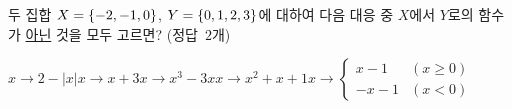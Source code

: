 두 집합 $X=\{-2{,}\mkern3mu\mathopen{}-1{,}\mkern3mu\mathopen{}0\}$, $Y=\{0{,}\mkern3mu\mathopen{}1{,}\mkern3mu\mathopen{}2{,}\mkern3mu\mathopen{}3\}$에 대하여 다음 대응 중 $X$에서 $Y$로의 함수가 \underline{아닌} 것을 모두 고르면? \mbox{(정답 $2$개)}
\begin{choicesii}{$x\longrightarrow 2-|x|$}{$x\longrightarrow x+3$}{$x\longrightarrow x^3-3x$}{$x\longrightarrow x^2+x+1$}{$x\longrightarrow \begin{cases} x-1 & (x\ge 0) \\ -x-1 & (x<0) \end{cases}$}\end{choicesii}
